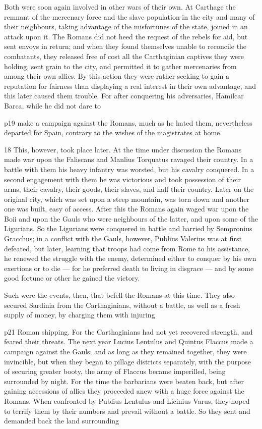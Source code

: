Both were soon again involved in other wars of their own. At Carthage the remnant of the mercenary force and the slave population in the city and many of their neighbours, taking advantage of the misfortunes of the state, joined in an attack upon it. The Romans did not heed the request of the rebels for aid, but sent envoys in return; and when they found themselves unable to reconcile the combatants, they released free of cost all the Carthaginian captives they were holding, sent grain to the city, and permitted it to gather mercenaries from among their own allies. By this action they were rather seeking to gain a reputation for fairness than displaying a real interest in their own advantage, and this later caused them trouble. For after conquering his adversaries, Hamilcar Barca, while he did not dare to

p19 make a campaign against the Romans, much as he hated them, nevertheless departed for Spain, contrary to the wishes of the magistrates at home.

18
This, however, took place later. At the time under discussion the Romans made war upon the Faliscans and Manlius Torquatus ravaged their country. In a battle with them his heavy infantry was worsted, but his cavalry conquered. In a second engagement with them he was victorious and took possession of their arms, their cavalry, their goods, their slaves, and half their country. Later on the original city, which was set upon a steep mountain, was torn down and another one was built, easy of access. After this the Romans again waged war upon the Boii and upon the Gauls who were neighbours of the latter, and upon some of the Ligurians. So the Ligurians were conquered in battle and harried by Sempronius Gracchus; in a conflict with the Gauls, however, Publius Valerius was at first defeated, but later, learning that troops had come from Rome to his assistance, he renewed the struggle with the enemy, determined either to conquer by his own exertions or to die \texthebrew{—} for he preferred death to living in disgrace \texthebrew{—} and by some good fortune or other he gained the victory.

Such were the events, then, that befell the Romans at this time. They also secured Sardinia from the Carthaginians, without a battle, as well as a fresh supply of money, by charging them with injuring

p21 Roman shipping. For the Carthaginians had not yet recovered strength, and feared their threats. The next year Lucius Lentulus and Quintus Flaccus made a campaign against the Gauls; and as long as they remained together, they were invincible, but when they began to pillage districts separately, with the purpose of securing greater booty, the army of Flaccus became imperilled, being surrounded by night. For the time the barbarians were beaten back, but after gaining accessions of allies they proceeded anew with a huge force against the Romans. When confronted by Publius Lentulus and Licinius Varus, they hoped to terrify them by their numbers and prevail without a battle. So they sent and demanded back the land surrounding

